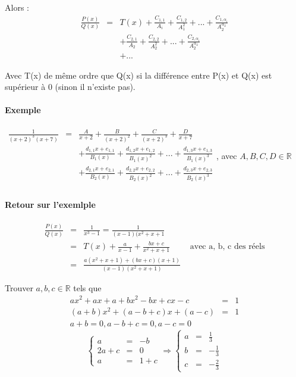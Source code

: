 	Alors : 
	\[\begin{array}{rcl}
			\frac{P(x)}{Q(x)} &=& T(x) + \frac{C_{1,1}}{A_i} + \frac{C_{1,2}}{A_1^2} + ... + \frac{C_{1,\alpha_i}}{A_2^{\alpha_2}} \\
								&& +\frac{C_{2,1}}{A_2} + \frac{C_{2,2}}{A_2^2} + ... + \frac{C_{2,\alpha_i}}{A_2^{\alpha_2}}  \\
			&& + ...
	\end{array}\]

	Avec T(x) de même ordre que Q(x) si la différence entre P(x) et Q(x) est supérieur à 0 (sinon il n'existe pas).

	\paragraph{Exemple} $\begin{array}{rcl}
		\frac{1}{(x+2)^3 (x+7)} &=& \frac{A}{x+2} + \frac{B}{(x+2)^2} + \frac{C}{(x+2)^3} + \frac{D}{x+7} \\
		&& + \frac{d_{1,1}x + e_{1,1}}{B_1(x)} +\frac{d_{1,2}x + e_{1,2}}{B_1(x)^2}  + ... + \frac{d_{1,3}x + e_{1,3}}{B_1(x)^3} \\
		&& + \frac{d_{2,1}x + e_{2,1}}{B_2(x)} +\frac{d_{2,2}x + e_{2,2}}{B_2(x)^2}  + ... + \frac{d_{2,3}x + e_{2,3}}{B_2(x)^3} \\
	\end{array}$, avec $A, B, C, D \in \mathbb{R}$

	\paragraph{Retour sur l'exemlple}

	\[\begin{array}{rclr}
			\frac{P(x)}{Q(x)} &=& \frac{1}{x^3 -1} = \frac{1}{(x-1)(x^2 + x + 1} \\
						   &=& T(x) + \frac{a}{x-1} + \frac{bx+c}{x^2 + x + 1} & \text{ avec a, b, c des réels} \\
						   &=& \frac{a(x^2 + x + 1) + (bx+c)(x+1)}{(x-1)(x^2 + x + 1)} \end{array}\]

			Trouver $a, b, c \in \mathbb{R}$ tels que \[\begin{array}{rcl}
					ax^2 + ax + a + bx^2 - bx + cx - c &=& 1 \\
					(a+b)x^2 + (a-b+c)x + (a-c) &=& 1 \\
				a+b = 0, a-b+c = 0, a-c = 0\end{array}
			\]
			\[\left\{\begin{array}{rcl}
						a &=& -b \\
						2a + c &=& 0 \\
					a&=& 1 + c \end{array}\right.
						\Rightarrow \left\{\begin{array}{rcl}
								a&=& \frac{1}{3} \\
								b &=& -\frac{1}{3} \\
						c &=& - \frac{2}{3}\end{array}\right.\]

